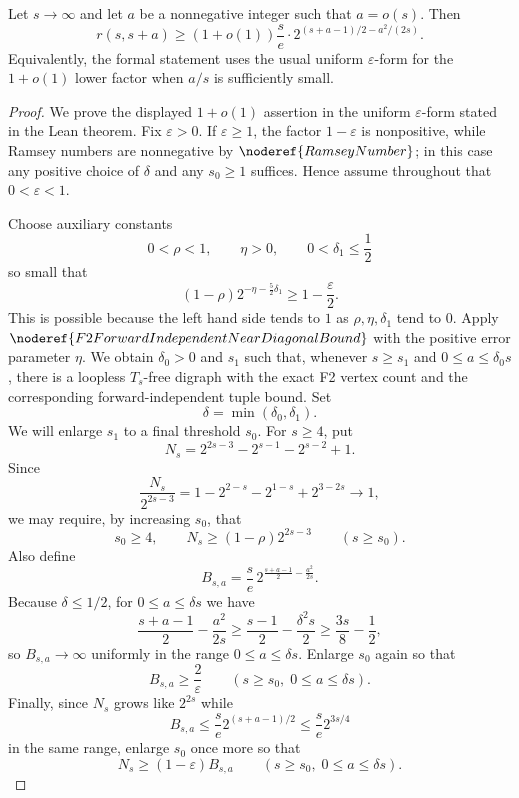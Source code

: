 \begin{theorem}
Let \(s\to\infty\) and let \(a\) be a nonnegative integer such that \(a=o(s)\). Then
\[
  r(s,s+a)\ge (1+o(1))\frac{s}{e}\cdot
  2^{(s+a-1)/2-a^2/(2s)}.
\]
Equivalently, the formal statement uses the usual uniform \(\varepsilon\)-form for the \(1+o(1)\) lower factor when \(a/s\) is sufficiently small.
\end{theorem}
\begin{proof}
We prove the displayed \(1+o(1)\) assertion in the uniform
\(\varepsilon\)-form stated in the Lean theorem. Fix \(\varepsilon>0\). If
\(\varepsilon\ge1\), the factor \(1-\varepsilon\) is nonpositive, while
Ramsey numbers are nonnegative by \(\noderef{RamseyNumber}\); in this case
any positive choice of \(\delta\) and any \(s_0\ge1\) suffices. Hence assume
throughout that \(0<\varepsilon<1\).

Choose auxiliary constants
\[
  0<\rho<1,\qquad \eta>0,\qquad 0<\delta_1\le \frac12
\]
so small that
\[
  (1-\rho)2^{-\eta-\frac52\delta_1}\ge 1-\frac{\varepsilon}{2}. \tag{1}
\]
This is possible because the left hand side tends to \(1\) as
\(\rho,\eta,\delta_1\) tend to \(0\). Apply
\(\noderef{F2ForwardIndependentNearDiagonalBound}\) with the positive error
parameter \(\eta\). We obtain \(\delta_0>0\) and \(s_1\) such that, whenever
\(s\ge s_1\) and \(0\le a\le\delta_0s\), there is a loopless \(T_s\)-free
digraph with the exact F2 vertex count and the corresponding
forward-independent tuple bound. Set
\[
  \delta=\min(\delta_0,\delta_1).
\]
We will enlarge \(s_1\) to a final threshold \(s_0\). For \(s\ge4\), put
\[
  N_s=2^{2s-3}-2^{s-1}-2^{s-2}+1.
\]
Since
\[
  \frac{N_s}{2^{2s-3}}
  =1-2^{2-s}-2^{1-s}+2^{3-2s}\longrightarrow 1,
\]
we may require, by increasing \(s_0\), that
\[
  s_0\ge4,\qquad
  N_s\ge (1-\rho)2^{2s-3}\qquad(s\ge s_0). \tag{2}
\]
Also define
\[
  B_{s,a}=\frac{s}{e}\,
  2^{\frac{s+a-1}{2}-\frac{a^2}{2s}}.
\]
Because \(\delta\le1/2\), for \(0\le a\le\delta s\) we have
\[
  \frac{s+a-1}{2}-\frac{a^2}{2s}
  \ge \frac{s-1}{2}-\frac{\delta^2s}{2}
  \ge \frac{3s}{8}-\frac12,
\]
so \(B_{s,a}\to\infty\) uniformly in the range \(0\le a\le\delta s\).
Enlarge \(s_0\) again so that
\[
  B_{s,a}\ge \frac{2}{\varepsilon}
  \qquad(s\ge s_0,\;0\le a\le\delta s). \tag{3}
\]
Finally, since \(N_s\) grows like \(2^{2s}\) while
\[
  B_{s,a}\le \frac{s}{e}2^{(s+a-1)/2}
  \le \frac{s}{e}2^{3s/4}
\]
in the same range, enlarge \(s_0\) once more so that
\[
  N_s\ge (1-\varepsilon)B_{s,a}
  \qquad(s\ge s_0,\;0\le a\le\delta s). \tag{4}
\]


\end{proof}
